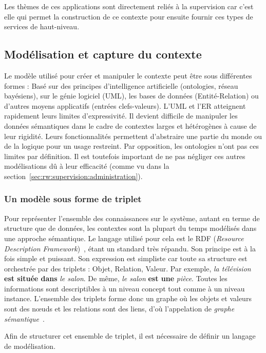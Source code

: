 Les thèmes de ces applications sont directement reliés à la supervision car c'est elle qui permet la construction de ce contexte pour ensuite fournir ces types de services de haut-niveau.

\subsection{Modélisation et capture du contexte}
Le modèle utilisé pour créer et manipuler le contexte peut être sous différentes formes : Basé sur des principes d'intelligence artificielle (ontologies, réseau bayésiens), sur le génie logiciel (UML), les bases de données (Entité-Relation) ou d'autres moyens applicatifs (entrées clefs-valeurs). L'UML et l'ER atteignent rapidement leurs limites d'expressivité. Il devient difficile de manipuler les données sémantiques dans le cadre de contextes larges et hétérogènes à cause de leur rigidité. Leurs fonctionnalités permettent d'abstraire une partie du monde ou de la logique pour un usage restreint. Par opposition, les ontologies n'ont pas ces limites par définition. Il est toutefois important de ne pas négliger ces autres modélisations dû à leur efficacité (comme vu dans la section~\ref{sec:rw:supervision:administration}).

\subsubsection{Un modèle sous forme de triplet}
Pour représenter l'ensemble des connaissances sur le système, autant en terme de structure que de données, les contextes sont la plupart du temps modélisés dans une approche sémantique. Le langage utilisé pour cela est le RDF (\textit{Resource Description Framework})~\cite{W3C:RDF}, étant un standard très répandu. Son principe est à la fois simple et puissant. Son expression est simpliste car toute sa structure est orchestrée par des triplets : Objet, Relation, Valeur. Par exemple, \textit{la télévision} \textbf{est située dans} \textit{le salon}. De même, \textit{le salon} \textbf{est une} \textit{pièce}. Toutes les informations sont descriptibles à un niveau concept tout comme à un niveau instance. L'ensemble des triplets forme donc un graphe où les objets et valeurs sont des nœuds et les relations sont des liens, d'où l'appelation de \textit{graphe sémantique}~\cite{Minsky:knowledge}.

Afin de structurer cet ensemble de triplet, il est nécessaire de définir un langage de modélisation.

